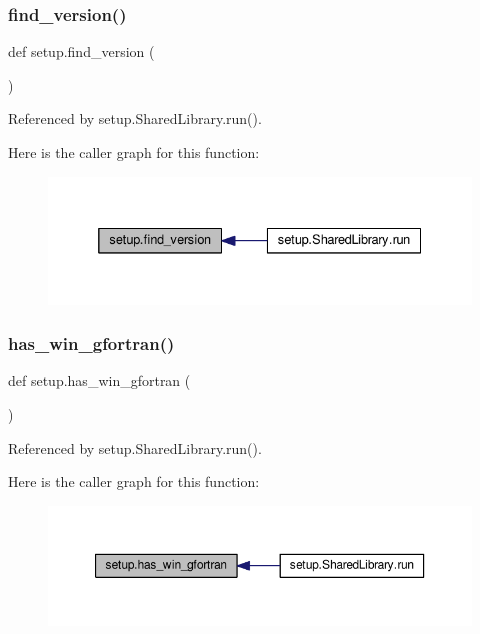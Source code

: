 \subsubsection{\texorpdfstring{find\+\_\+version()}{find\_version()}}
{\footnotesize\ttfamily def setup.\+find\+\_\+version (\begin{DoxyParamCaption}{ }\end{DoxyParamCaption})}



Referenced by setup.\+Shared\+Library.\+run().

Here is the caller graph for this function\+:
\nopagebreak
\begin{figure}[H]
\begin{center}
\leavevmode
\includegraphics[width=332pt]{namespacesetup_a81fe34e138f28e550cb579b246bc735e_icgraph}
\end{center}
\end{figure}
\mbox{\label{namespacesetup_a44ec38f1dccfde84284d2f0ceaa35b69}} 
\subsubsection{\texorpdfstring{has\+\_\+win\+\_\+gfortran()}{has\_win\_gfortran()}}
{\footnotesize\ttfamily def setup.\+has\+\_\+win\+\_\+gfortran (\begin{DoxyParamCaption}{ }\end{DoxyParamCaption})}



Referenced by setup.\+Shared\+Library.\+run().

Here is the caller graph for this function\+:
\nopagebreak
\begin{figure}[H]
\begin{center}
\leavevmode
\includegraphics[width=350pt]{namespacesetup_a44ec38f1dccfde84284d2f0ceaa35b69_icgraph}
\end{center}
\end{figure}


